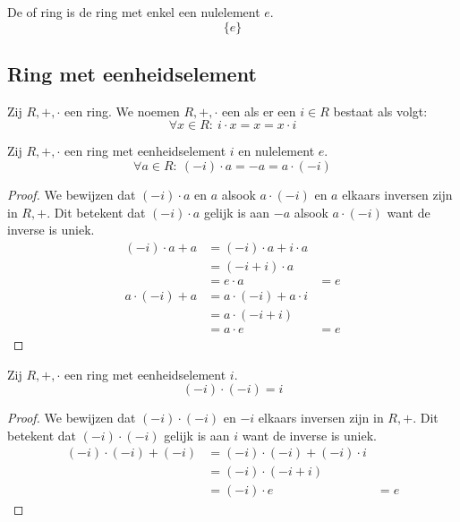 \documentclass[main.tex]{subfiles}
\begin{document}
\begin{de}
  \label{de:nulring}
  De  of  ring is de ring met enkel een nulelement $e$.
  \[ \{ e \} \]
\end{de}

\subsection{Ring met eenheidselement}
\label{sec:ring-met-eenheidselement}

\begin{de}
  Zij $R,+,\cdot$ een ring.
  We noemen $R,+,\cdot$ een  als er een  $i\in R$ bestaat als volgt:
  \[ \forall x\in R:\ i\cdot x = x = x \cdot i \]
\end{de}

\begin{ei}
  Zij $R,+,\cdot$ een ring met eenheidselement $i$ en nulelement $e$.
  \[ \forall a \in R:\ (-i)\cdot a = -a = a \cdot (-i) \]

  \begin{proof}
    We bewijzen dat $(-i) \cdot a$ en $a$ alsook $a \cdot (-i)$ en $a$ elkaars inversen zijn in $R,+$.
    Dit betekent dat $(-i) \cdot a$ gelijk is aan $-a$ alsook $a\cdot (-i)$ want de inverse is uniek.
    \[
    \begin{array}{rll}
      (-i) \cdot a + a &= (-i) \cdot a + i \cdot a &\\
                       &= (-i + i) \cdot a &\\
                       &= e \cdot a &= e
    \end{array}
    \]
    \[
    \begin{array}{rll}
      a \cdot (-i) + a &= a \cdot (-i) + a \cdot i &\\
                       &= a \cdot (-i+i) &\\
                       &= a \cdot e &= e
    \end{array}
    \]
  \end{proof}
\end{ei}

\begin{ei}
  Zij $R,+,\cdot$ een ring met eenheidselement $i$.
  \[ (-i) \cdot (-i) = i\]
  \begin{proof}
    We bewijzen dat $(-i) \cdot (-i)$ en $-i$ elkaars inversen zijn in $R,+$.
    Dit betekent dat $(-i) \cdot (-i)$ gelijk is aan $i$ want de inverse is uniek.
    \[
    \begin{array}{rll}
      (-i) \cdot (-i) + (-i) &= (-i) \cdot (-i) + (-i) \cdot i &\\
                             &= (-i) \cdot (-i + i) &\\
                             &= (-i) \cdot e &= e
    \end{array}
    \]
  \end{proof}
\end{ei}
\end{document}
